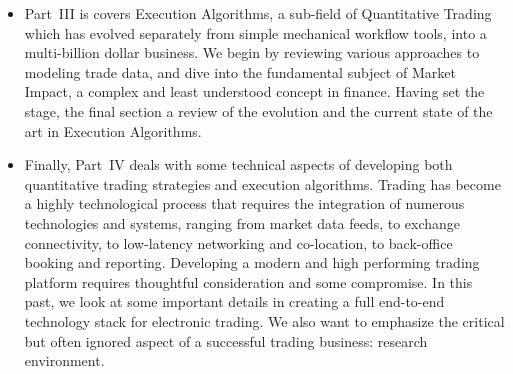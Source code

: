 \begin{itemize}
\item Part~III is covers Execution Algorithms, a sub-field of Quantitative Trading which has evolved separately from simple mechanical workflow tools, into a multi-billion dollar business. We begin by reviewing various approaches to modeling trade data, and dive into the fundamental subject of Market Impact, a complex and least understood concept in finance. Having set the stage, the final section a review of the evolution and the current state of the art in Execution Algorithms.

\item Finally, Part~IV deals with some technical aspects of developing both quantitative trading strategies and execution algorithms. Trading has become a highly technological process that requires the integration of numerous technologies and systems,  ranging from market data feeds, to exchange connectivity, to low-latency networking and co-location, to back-office booking and reporting. Developing a modern and high performing trading platform requires thoughtful consideration and some compromise. In this past, we look at some important details in creating a full end-to-end technology stack for electronic trading. We also want to emphasize the critical but often ignored aspect of a successful trading business: research environment.
\end{itemize} 

\newpage




 
